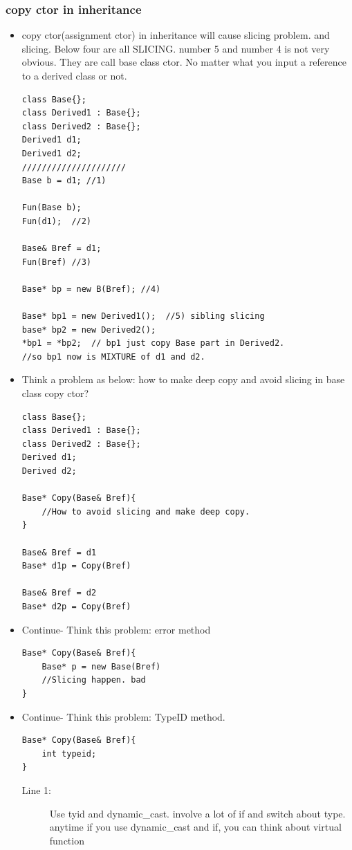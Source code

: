 \documentclass[a4paper,11pt,twoside]{book}
\begin{document}
\subsubsection{copy ctor in inheritance}

\begin{itemize}
	\item copy ctor(assignment ctor) in inheritance will cause slicing problem.  and slicing. Below four are all SLICING.  number 5 and number 4 is not very obvious. They are call base class ctor.  No matter what you input a reference to a derived class or not.
\begin{lstlisting}[numbers=none]
class Base{};
class Derived1 : Base{};
class Derived2 : Base{};
Derived1 d1;
Derived1 d2;
/////////////////////
Base b = d1; //1)
	
Fun(Base b);
Fun(d1);  //2)
	
Base& Bref = d1;
Fun(Bref) //3)
	
Base* bp = new B(Bref); //4)
	
Base* bp1 = new Derived1();  //5) sibling slicing
base* bp2 = new Derived2();
*bp1 = *bp2;  // bp1 just copy Base part in Derived2.
//so bp1 now is MIXTURE of d1 and d2.
\end{lstlisting}
	
\item Think a problem as below: how to make deep copy and avoid slicing in base class copy ctor?
\begin{lstlisting}[numbers=none]
class Base{};
class Derived1 : Base{};
class Derived2 : Base{};
Derived d1;
Derived d2;
	
Base* Copy(Base& Bref){
	//How to avoid slicing and make deep copy.
}
	
Base& Bref = d1
Base* d1p = Copy(Bref)

Base& Bref = d2
Base* d2p = Copy(Bref)
	\end{lstlisting}
	
\item Continue- Think this problem: error method
\begin{lstlisting}[numbers=none]
Base* Copy(Base& Bref){
	Base* p = new Base(Bref)
	//Slicing happen. bad
}
\end{lstlisting}
	\item Continue- Think this problem: TypeID method.
\begin{lstlisting}[numbers=none]
Base* Copy(Base& Bref){
	int typeid;
}
\end{lstlisting}
\begin{description}
	\item[Line 1:] Use tyid and dynamic\_cast. involve a lot of if and switch about type. anytime if you use dynamic\_cast and if, you can think about virtual function
\end{description}
	

\end{itemize}
\end{document}
